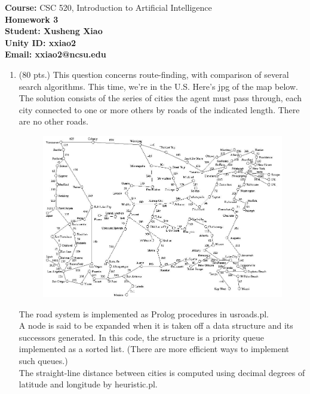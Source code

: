 \documentclass{article}%
\begin{document}
\begin{flushleft}
\textbf{Course:} CSC 520, Introduction to Artificial Intelligence\\
\textbf{Homework 3}\\
\textbf{Student: Xusheng Xiao} \\
\textbf{Unity ID: xxiao2} \\
\textbf{Email: xxiao2@ncsu.edu}
\end{flushleft}

\noindent{\hrulefill}

\bigskip

\begin{enumerate}
	\item (80 pts.) This question concerns route-finding, with comparison of several search algorithms. This time, we're in the U.S. Here's jpg of the map below. The solution consists of the series of cities the agent must pass through, each city connected to one or more others by roads of the indicated length. There are no other roads. %
	\begin{figure}[h]
	\begin{center}
  	\includegraphics[scale=0.35]{map.png}
	\end{center}
	\end{figure} 
The road system is implemented as Prolog procedures in usroads.pl. \\
A node is said to be expanded when it is taken off a data structure and its successors generated. In this code, the structure is a priority queue implemented as a sorted list. (There are more efficient ways to implement such queues.) \\
The straight-line distance between cities is computed using decimal degrees of latitude and longitude by heuristic.pl. \\

\end{enumerate}
\end{document}
